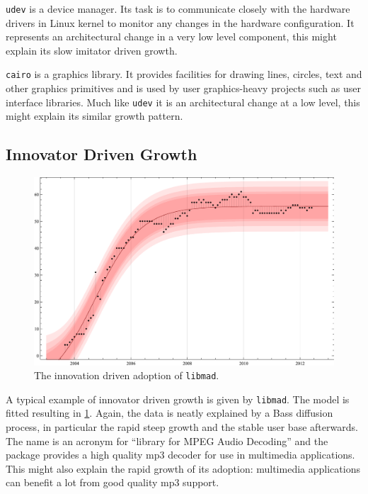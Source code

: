 \documentclass[smallextended,final]{svjour3}
\begin{document}
\verb|udev| is a device manager. Its task is to communicate closely with the hardware drivers in Linux kernel to monitor any changes in the hardware configuration. It represents an architectural change in a very low level component, this might explain its slow imitator driven growth.

\verb|cairo| is a graphics library. It provides facilities for drawing lines, circles, text and other graphics primitives and is used by user graphics-heavy projects such as user interface libraries. Much like \verb|udev| it is an architectural change at a low level, this might explain its similar growth pattern.

\subsection{Innovator Driven Growth}

\begin{figure}
\small\centering
\includegraphics[width=\linewidth]{BassFit-libmad2.pdf}
\vspace{-2em}
\caption{The innovation driven adoption of \texttt{libmad}.}\label{fig:libmad}
\vspace{-1em}
\end{figure}

A typical example of innovator driven growth is given by \verb|libmad|. The model is fitted resulting in \ref{fig:libmad}. Again, the data is neatly explained by a Bass diffusion process, in particular the rapid steep growth and the stable user base afterwards. The name is an acronym for ``library for MPEG Audio Decoding'' and the package provides a high quality mp3 decoder for use in multimedia applications. This might also explain the rapid growth of its adoption: multimedia applications can benefit a lot from good quality mp3 support.
\end{document}
